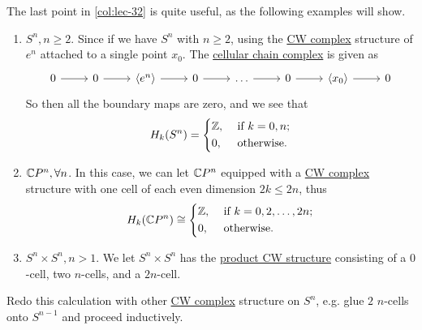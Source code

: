 \begin{eg}
	The last point in \autoref{col:lec-32} is quite useful, as the following examples will show.
	\begin{enumerate}
		\item \(S^n, n \geq 2\). Since if we have \(S^n\) with \(n \geq 2\), using the \hyperref[def:CW-Complex]{CW complex} structure of
		      \(e^n\) attached to a single point \(x_0\). The \hyperref[def:cellular-chain-complex]{cellular chain complex} is given as
		      \[
			      \begin{tikzcd}
				      0 & 0 & {\left<e^n\right>} & 0 & \ldots & 0 & {\left<x_0\right>} & 0
				      \arrow[from=1-1, to=1-2]
				      \arrow[from=1-2, to=1-3]
				      \arrow[from=1-3, to=1-4]
				      \arrow[from=1-4, to=1-5]
				      \arrow[from=1-5, to=1-6]
				      \arrow[from=1-6, to=1-7]
				      \arrow[from=1-7, to=1-8]
			      \end{tikzcd}
		      \]
		      So then all the boundary maps are zero, and we see that
		      \[
			      H_k(S^n) = \begin{dcases}
				      \mathbb{\MakeUppercase{z}}, & \text{ if } k=0, n ; \\
				      0,                          & \text{ otherwise}.
			      \end{dcases}
		      \]
		\item \(\mathbb{\MakeUppercase{c}} P^n, \forall n\). In this case, we can let \(\mathbb{\MakeUppercase{c}} P^n\) equipped with a
		      \hyperref[def:CW-Complex]{CW complex} structure with one cell of each even dimension \(2k \leq 2n\), thus
		      \[
			      H_{k}(\mathbb{\MakeUppercase{c}} P^n) \cong \begin{dcases}
				      \mathbb{\MakeUppercase{z}}, & \text{ if } k = 0, 2, \ldots , 2n; \\
				      0,                          & \text{ otherwise}.
			      \end{dcases}
		      \]
		\item \(S^n \times S^n, n > 1\). We let \(S^n \times S^n\) has the \hyperref[CW-complex-product]{product CW structure} consisting
		      of a \(0\)-cell, two \(n\)-cells, and a \(2n\)-cell.
	\end{enumerate}
\end{eg}

\begin{exercise}
	Redo this calculation with other \hyperref[def:CW-Complex]{CW complex} structure on \(S^n\), e.g. glue \(2\) \(n\)-cells onto \(S^{n - 1}\) and proceed inductively.
\end{exercise}